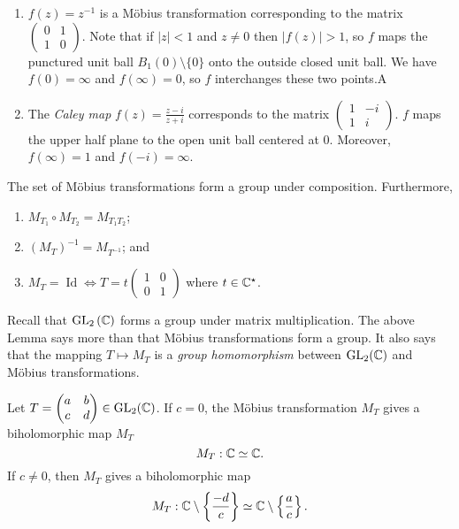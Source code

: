 \begin{example}
    \begin{enumerate}
        \item $f(z) = z^{-1}$ is a M\"obius transformation corresponding to the matrix
            $\begin{pmatrix} 0 & 1 \\ 1 & 0 \end{pmatrix}$.
            Note that if $\lvert z \rvert < 1$ and $z \neq 0$ then $\lvert f(z) \rvert > 1$, so $f$ maps the punctured unit ball $B_1(0)\setminus\{0\}$ onto the outside closed unit ball. We have $f(0) = \infty$ and $f(\infty) = 0$, so $f$ interchanges these two points.A
        \item The \emph{Caley map} $f(z) = \frac{z-i}{z+i}$ corresponds to the matrix
            $\begin{pmatrix} 1 & -i \\ 1 & i \end{pmatrix}$.
            $f$ maps the upper half plane to the open unit ball centered at $0$. Moreover, $f(\infty) = 1$ and $f(-i) = \infty$.
    \end{enumerate}
\end{example}

\begin{lemma}
    The set of M\"obius transformations form a group under composition. Furthermore,
    \begin{enumerate}
        \item $M_{T_1} \circ M_{T_2} = M_{T_1T_2}$;
        \item $(M_T)^{-1} = M_{T^{-1}}$; and
        \item $M_T = \operatorname{Id} \iff T = t \begin{pmatrix} 1 & 0 \\ 0 & 1 \end{pmatrix}$
            where $t \in \mathbb{C}^\star$.
    \end{enumerate}
\end{lemma}


\begin{remark}
    Recall that $\operatorname{GL}_2{(\mathbb{C})}$ forms a group under matrix multiplication. The above Lemma says more than that M\"obius transformations form a group. It also says that the mapping $T \mapsto M_T$ is a \emph{group homomorphism} between $\operatorname{GL}_2(\mathbb{C})$ and M\"obius transformations. 
\end{remark}

\begin{lemma}[]
    Let $T = \begin{pmatrix} a & b \\ c & d \end{pmatrix} \in \operatorname{GL}_2(\mathbb{C})$. If $c = 0$, the M\"obius transformation $M_T$ gives a biholomorphic map $M_T$ 
    \[ M_T: \mathbb{C} \simeq \mathbb{C}. \]
    If $c \neq 0$, then $M_T$ gives a biholomorphic map
    \[ M_T: \mathbb{C} \setminus \left\{ \frac{-d}{c} \right\} \simeq \mathbb{C} \setminus \left\{ \frac ac \right\}. \]
\end{lemma}

